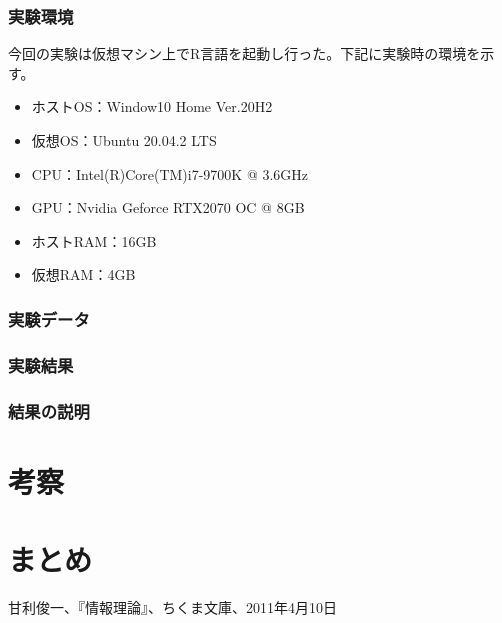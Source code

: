 \documentclass[dvipdfmx]{jsarticle}
\begin{document}
  \subsubsection{実験環境}
  今回の実験は仮想マシン上でR言語を起動し行った。下記に実験時の環境を示す。
  \begin{itemize}
    \item ホストOS：Window10 Home Ver.20H2
    \item 仮想OS：Ubuntu 20.04.2 LTS
    \item CPU：Intel(R)Core(TM)i7-9700K @ 3.6GHz
    \item GPU：Nvidia Geforce RTX2070 OC @ 8GB
    \item ホストRAM：16GB
    \item 仮想RAM：4GB
  \end{itemize}
\subsubsection{実験データ}
\subsubsection{実験結果}
\subsubsection{結果の説明}
\section{考察}
\section{まとめ}
\begin{thebibliography}{99}
   甘利俊一、『情報理論』、ちくま文庫、2011年4月10日
\end{thebibliography}
\end{document}
